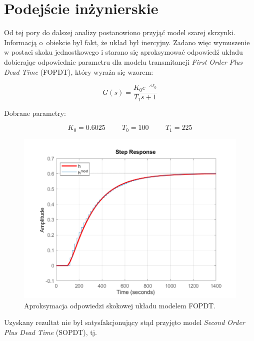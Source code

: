 \newpage

\section{Podejście inżynierskie}
Od tej pory do dalszej analizy postanowiono przyjąć model szarej skrzynki. Informacją o~obiekcie był fakt, że układ był inercyjny. Zadano więc wymuszenie w postaci skoku jednostkowego i starano się aproksymować odpowiedź układu dobierając odpowiednie parametru dla modelu transmitancji \textit{First Order Plus Dead Time} (FOPDT), który wyraża się wzorem:

\begin{equation}
G(s) = \frac{K_0e^{-sT_0}}{T_1s + 1}
\end{equation}

\noindent Dobrane parametry:

\begin{equation}
K_0 = \num{0.6025} \hspace{1cm} T_0 = 100 \hspace{1cm} T_1 = 225
\end{equation}

\begin{figure}[h!]
\centering
\includegraphics[width=\textwidth]{pictures/model_fopdt}
\caption{Aproksymacja odpowiedzi skokowej układu modelem FOPDT.}
\end{figure}

\newpage

Uzyskany rezultat nie był satysfakcjonujący stąd przyjęto model \textit{Second Order Plus Dead Time} (SOPDT), tj.

